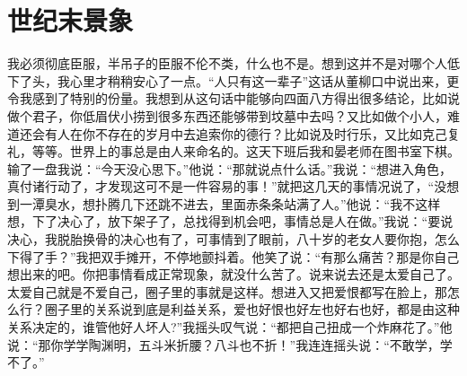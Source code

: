 \documentclass[12pt,oneside]{book}
\begin{document}
\chapter{世纪末景象}

我必须彻底臣服，半吊子的臣服不伦不类，什么也不是。想到这并不是对哪个人低下了头，我心里才稍稍安心了一点。``人只有这一辈子''这话从董柳口中说出来，更令我感到了特别的份量。我想到从这句话中能够向四面八方得出很多结论，比如说做个君子，你低眉伏小捞到很多东西还能够带到坟墓中去吗？又比如做个小人，难道还会有人在你不存在的岁月中去追索你的德行？比如说及时行乐，又比如克己复礼，等等。世界上的事总是由人来命名的。这天下班后我和晏老师在图书室下棋。输了一盘我说：``今天没心思下。''他说：``那就说点什么话。''我说：``想进入角色，真付诸行动了，才发现这可不是一件容易的事！''就把这几天的事情况说了，``没想到一潭臭水，想扑腾几下还跳不进去，里面赤条条站满了人。''他说：``我不这样想，下了决心了，放下架子了，总找得到机会吧，事情总是人在做。''我说：``要说决心，我脱胎换骨的决心也有了，可事情到了眼前，八十岁的老女人要你抱，怎么下得了手？''我把双手摊开，不停地颤抖着。他笑了说：``有那么痛苦？那是你自己想出来的吧。你把事情看成正常现象，就没什么苦了。说来说去还是太爱自己了。太爱自己就是不爱自己，圈子里的事就是这样。想进入又把爱恨都写在脸上，那怎么行？圈子里的关系说到底是利益关系，爱也好恨也好左也好右也好，都是由这种关系决定的，谁管他好人坏人?''我摇头叹气说：``都把自己扭成一个炸麻花了。''他说：``那你学学陶渊明，五斗米折腰？八斗也不折！''我连连摇头说：``不敢学，学不了。''
\end{document}
